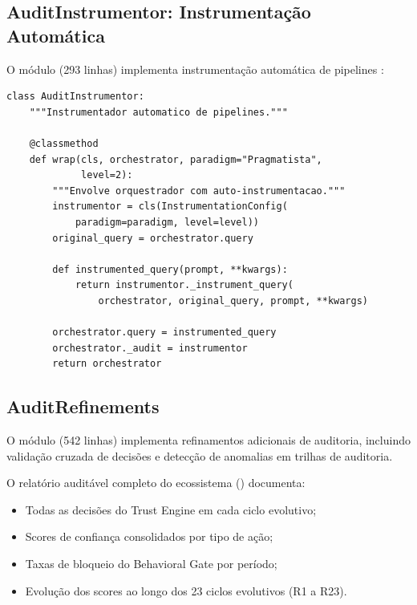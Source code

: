 \subsection{AuditInstrumentor: Instrumentação Automática}

O módulo  (293 linhas) implementa
instrumentação automática de pipelines \cite{opencode2026ecosystem}:

\begin{lstlisting}[style=pythonstyle, caption={AuditInstrumentor: auto-instrumentacao (audit\_instrumentor.py:51-112)}]
class AuditInstrumentor:
    """Instrumentador automatico de pipelines."""

    @classmethod
    def wrap(cls, orchestrator, paradigm="Pragmatista",
             level=2):
        """Envolve orquestrador com auto-instrumentacao."""
        instrumentor = cls(InstrumentationConfig(
            paradigm=paradigm, level=level))
        original_query = orchestrator.query

        def instrumented_query(prompt, **kwargs):
            return instrumentor._instrument_query(
                orchestrator, original_query, prompt, **kwargs)

        orchestrator.query = instrumented_query
        orchestrator._audit = instrumentor
        return orchestrator
\end{lstlisting}

\subsection{AuditRefinements}

O módulo  (542 linhas) implementa
refinamentos adicionais de auditoria, incluindo validação cruzada de
decisões e detecção de anomalias em trilhas de auditoria.

\begin{exemplo}
O relatório auditável completo do ecossistema
() documenta:
\begin{itemize}
\item Todas as decisões do Trust Engine em cada ciclo evolutivo;
\item Scores de confiança consolidados por tipo de ação;
\item Taxas de bloqueio do Behavioral Gate por período;
\item Evolução dos scores ao longo dos 23 ciclos evolutivos (R1 a R23).
\end{itemize}
\end{exemplo}

